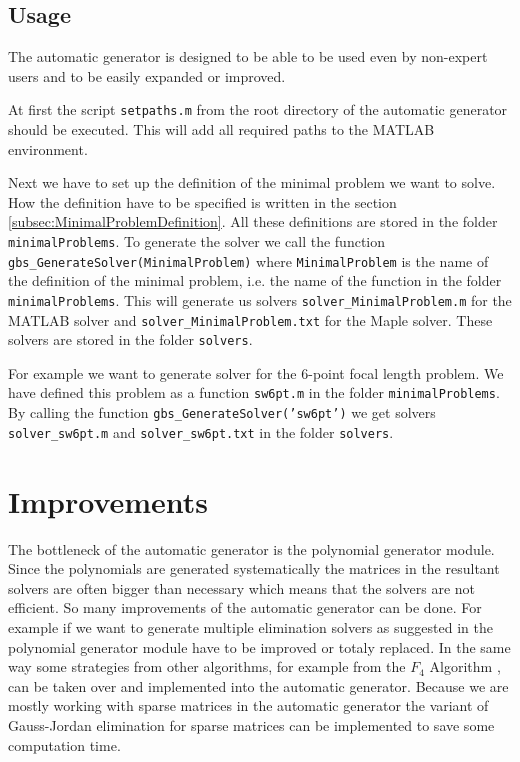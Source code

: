 \subsection{Usage}
The automatic generator is designed to be able to be used even by non-expert users and to be easily expanded or improved.

At first the script \texttt{setpaths.m} from the root directory of the automatic generator should be executed. This will add all required paths to the MATLAB environment.

Next we have to set up the definition of the minimal problem we want to solve. How the definition have to be specified is written in the section \ref{subsec:MinimalProblemDefinition}. All these definitions are stored in the folder \texttt{minimalProblems}. To generate the solver we call the function \texttt{gbs\_GenerateSolver(MinimalProblem)} where \texttt{MinimalProblem} is the name of the definition of the minimal problem, i.e. the name of the function in the folder \texttt{minimalProblems}. This will generate us solvers \texttt{solver\_MinimalProblem.m} for the MATLAB solver and \texttt{solver\_MinimalProblem.txt} for the Maple solver. These solvers are stored in the folder \texttt{solvers}.

For example we want to generate solver for the 6-point focal length problem. We have defined this problem as a function \texttt{sw6pt.m} in the folder \texttt{minimalProblems}. By calling the function \texttt{gbs\_GenerateSolver('sw6pt')} we get solvers \texttt{solver\_sw6pt.m} and \texttt{solver\_sw6pt.txt} in the folder \texttt{solvers}.

\section{Improvements}
The bottleneck of the automatic generator is the polynomial generator module. Since the polynomials are generated systematically the matrices in the resultant solvers are often bigger than necessary which means that the solvers are not efficient. So many improvements of the automatic generator \cite{AutoGen} can be done. For example if we want to generate multiple elimination solvers as suggested in \cite{KukelovaAlgMethods} the polynomial generator module have to be improved or totaly replaced. In the same way some strategies from other algorithms, for example from the $F_4$ Algorithm \cite{F4}, can be taken over and implemented into the automatic generator. Because we are mostly working with sparse matrices in the automatic generator the variant of Gauss-Jordan elimination for sparse matrices can be implemented to save some computation time.

